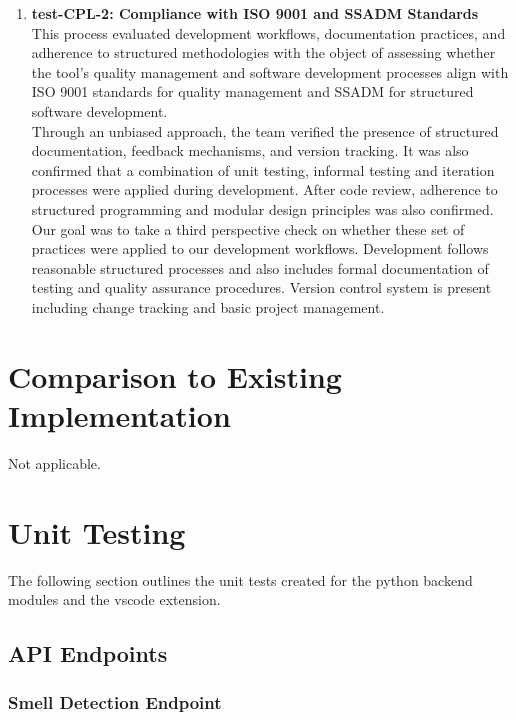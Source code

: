 \documentclass[12pt, titlepage]{article}
\begin{document}
\begin{enumerate}
  \item \textbf{test-CPL-2: Compliance with ISO 9001 and SSADM
    Standards} \\[2mm]
    This process evaluated development workflows, documentation
    practices, and adherence to structured methodologies with the
    object of assessing whether the tool's quality management and
    software development processes align with ISO 9001 standards for
    quality management and SSADM for structured software development.\\
    \noindent Through an unbiased approach, the team verified the
    presence of structured documentation, feedback mechanisms, and
    version tracking. It was also confirmed that a combination of
    unit testing, informal testing and iteration processes were
    applied during development. After code review, adherence to
    structured programming and modular design principles was also confirmed.
    \noindent Our goal was to take a third perspective check on
    whether these set of practices were applied to our development
    workflows. Development follows reasonable structured processes
    and also includes formal documentation of testing and quality
    assurance procedures. Version control system is present including
    change tracking and basic project management.

\end{enumerate}

\section{Comparison to Existing Implementation}

Not applicable.

\section{Unit Testing}

The following section outlines the unit tests created for the python
backend modules and the vscode extension.

\newcommand{\testcount}{\stepcounter{testcase}\thetestcase}
\renewcommand{\arraystretch}{1.2} %

\subsection{API Endpoints}

\subsubsection{Smell Detection Endpoint}
\end{document}
